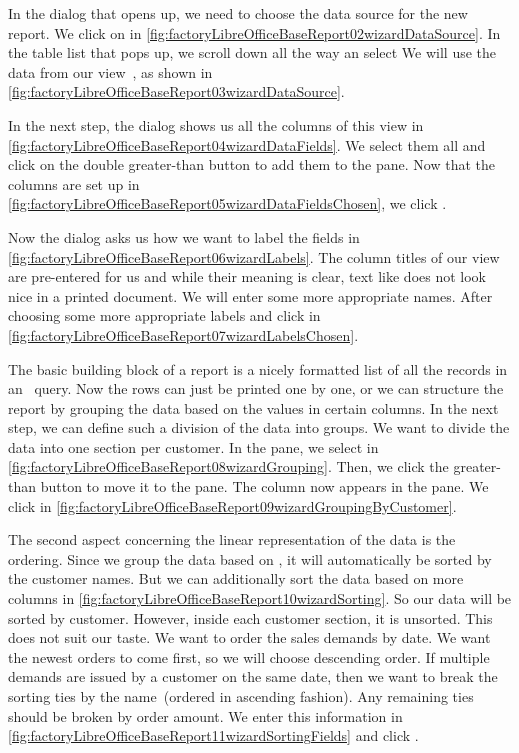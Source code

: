 In the dialog that opens up, we need to choose the data source for the new report.
We click on  in \cref{fig:factoryLibreOfficeBaseReport02wizardDataSource}.
In the table list that pops up, we scroll down all the way an select 
We will use the data from our view~, as shown in \cref{fig:factoryLibreOfficeBaseReport03wizardDataSource}.

In the next step, the dialog shows us all the columns of this view in \cref{fig:factoryLibreOfficeBaseReport04wizardDataFields}.
We select them all and click on the double greater-than button \menu{\textgreater\textgreater} to add them to the  pane.
Now that the columns are set up in \cref{fig:factoryLibreOfficeBaseReport05wizardDataFieldsChosen}, we click .

Now the dialog asks us how we want to label the fields in \cref{fig:factoryLibreOfficeBaseReport06wizardLabels}.
The column titles of our view are pre-entered for us and while their meaning is clear, text like  does not look nice in a printed document.
We will enter some more appropriate names.
After choosing some more appropriate labels and click  in \cref{fig:factoryLibreOfficeBaseReport07wizardLabelsChosen}.

The basic building block of a report is a nicely formatted list of all the records in an \sql\ query.
Now the rows can just be printed one by one, or we can structure the report by grouping the data based on the values in certain columns.
In the next step, we can define such a division of the data into groups.
We want to divide the data into one section per customer.
In the  pane, we select  in \cref{fig:factoryLibreOfficeBaseReport08wizardGrouping}.
Then, we click the greater-than button \menu{\textgreater} to move it to the  pane.
The column now appears in the  pane.
We click  in \cref{fig:factoryLibreOfficeBaseReport09wizardGroupingByCustomer}.

The second aspect concerning the linear representation of the data is the ordering.
Since we group the data based on , it will automatically be sorted by the customer names.
But we can additionally sort the data based on more columns in \cref{fig:factoryLibreOfficeBaseReport10wizardSorting}.
So our data will be sorted by customer.
However, inside each customer section, it is unsorted.
This does not suit our taste.
We want to order the sales demands by  date.
We want the newest orders to come first, so we will choose descending order.
If multiple demands are issued by a customer on the same date, then we want to break the sorting ties by the  name~(ordered in ascending fashion).
Any remaining ties should be broken by order amount.
We enter this information in \cref{fig:factoryLibreOfficeBaseReport11wizardSortingFields} and click .

